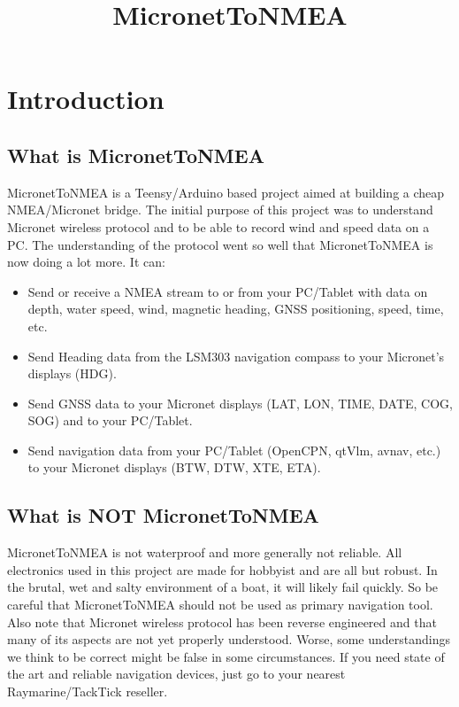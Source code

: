 \documentclass{report}
\begin{document}
\title{MicronetToNMEA}

\chapter {Introduction}

\section{What is MicronetToNMEA}

MicronetToNMEA is a Teensy/Arduino based project aimed at building a cheap NMEA/Micronet bridge. The initial purpose of this project was to understand Micronet wireless protocol and to be able to record wind and speed data on a PC. The understanding of the protocol went so well that MicronetToNMEA is now doing a lot more. It can:

\begin{itemize}
\item Send or receive a NMEA stream to or from your PC/Tablet with data on depth, water speed, wind, magnetic heading, GNSS positioning, speed, time, etc.
\item Send Heading data from the LSM303 navigation compass to your Micronet's displays (HDG).
\item Send GNSS data to your Micronet displays (LAT, LON, TIME, DATE, COG, SOG) and to your PC/Tablet.
\item Send navigation data from your PC/Tablet (OpenCPN, qtVlm, avnav, etc.) to your Micronet displays (BTW, DTW, XTE, ETA).
\end{itemize}

\section{What is NOT MicronetToNMEA}

MicronetToNMEA is not waterproof and more generally not reliable. All electronics used in this project are made for hobbyist and are all but robust. In the brutal, wet and salty environment of a boat, it will likely fail quickly. So be careful that MicronetToNMEA should not be used as primary navigation tool. Also note that Micronet wireless protocol has been reverse engineered and that many of its aspects are not yet properly understood. Worse, some understandings we think to be correct might be false in some circumstances. If you need state of the art and reliable navigation devices, just go to your nearest Raymarine/TackTick reseller.
\end{document}

